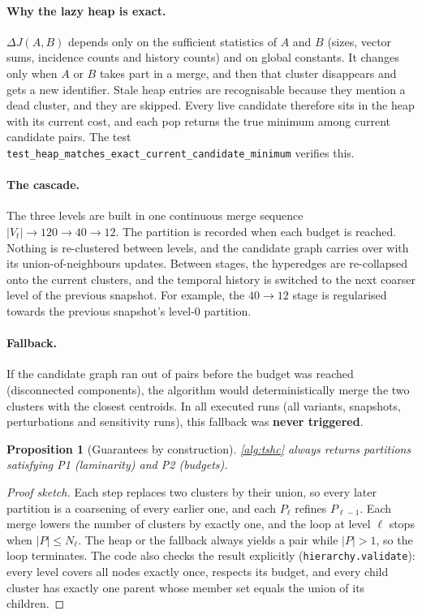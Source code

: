 \documentclass[11pt,a4paper]{article}
\newcommand{\Cref}[1]{\autoref{#1}}
\newtheorem{proposition}{Proposition}[section]
\theoremstyle{remark}
\newcommand{\code}[1]{\texttt{\small #1}}
\begin{document}
\paragraph{Why the lazy heap is exact.}
$\Delta J(A,B)$ depends only on the sufficient statistics of $A$ and $B$ (sizes,
vector sums, incidence counts and history counts) and on global constants. It changes
only when $A$ or $B$ takes part in a merge, and then that cluster disappears and gets
a new identifier. Stale heap entries are recognisable because they mention a dead
cluster, and they are skipped. Every live candidate therefore sits in the heap with its
current cost, and each pop returns the true minimum among current candidate pairs. The
test \code{test\_heap\_matches\_exact\_current\_candidate\_minimum} verifies this.

\paragraph{The cascade.}
The three levels are built in one continuous merge sequence
$|V_t|\to120\to40\to12$. The partition is recorded when each budget is reached.
Nothing is re-clustered between levels, and the candidate graph carries over with its
union-of-neighbours updates. Between stages, the hyperedges are re-collapsed onto the
current clusters, and the temporal history is switched to the next coarser level of
the previous snapshot. For example, the $40\to12$ stage is regularised towards the
previous snapshot's level-0 partition.

\paragraph{Fallback.}
If the candidate graph ran out of pairs before the budget was reached (disconnected
components), the algorithm would deterministically merge the two clusters with the
closest centroids. In all executed runs (all variants, snapshots, perturbations and
sensitivity runs), this fallback was \textbf{never triggered}.

\begin{proposition}[Guarantees by construction]
\label{prop:laminar}
\Cref{alg:tshc} always returns partitions satisfying P1 (laminarity) and P2 (budgets).
\end{proposition}
\begin{proof}[Proof sketch]
Each step replaces two clusters by their union, so every later partition is a
coarsening of every earlier one, and each $P_\ell$ refines $P_{\ell-1}$. Each merge
lowers the number of clusters by exactly one, and the loop at level $\ell$ stops when
$|P|\le N_\ell$. The heap or the fallback always yields a pair while $|P|>1$, so the
loop terminates. The code also checks the result explicitly (\code{hierarchy.validate}):
every level covers all nodes exactly once, respects its budget, and every child cluster
has exactly one parent whose member set equals the union of its children.
\end{proof}
\end{document}
